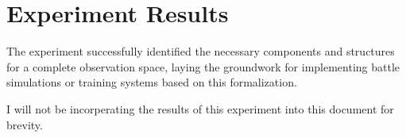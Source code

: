 \section{Experiment Results}
The experiment successfully identified the necessary components and structures for a complete observation space, laying the groundwork for implementing battle simulations or training systems based on this formalization.

I will not be incorperating the results of this experiment into this document for brevity.
